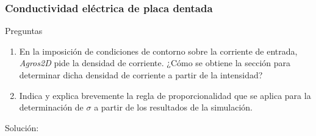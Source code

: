 \vspace*{2em}

\begin{Enunciado}
	\subsubsection{Conductividad eléctrica de placa dentada}
	Preguntas
	\begin{enumerate}[label=\alph*)]
		\item En la imposición de condiciones de contorno sobre la corriente de entrada, \textit{Agros2D} pide la densidad de corriente. ¿Cómo se obtiene la sección para determinar dicha densidad de corriente a partir de la intensidad?
		\item Indica y explica brevemente la regla de proporcionalidad que se aplica para la determinación de $\sigma$ a partir de los resultados de la simulación.
	\end{enumerate}
\end{Enunciado}

Solución:

